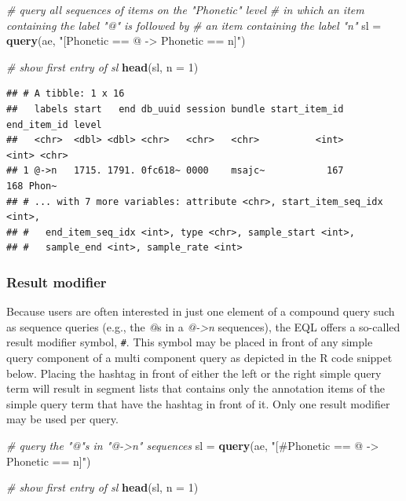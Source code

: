 \documentclass[]{book}
\newenvironment{Shaded}{\begin{snugshade}}{\end{snugshade}}
\newcommand{\CommentTok}[1]{\textcolor[rgb]{0.56,0.35,0.01}{\textit{#1}}}
\newcommand{\DataTypeTok}[1]{\textcolor[rgb]{0.13,0.29,0.53}{#1}}
\newcommand{\DecValTok}[1]{\textcolor[rgb]{0.00,0.00,0.81}{#1}}
\newcommand{\KeywordTok}[1]{\textcolor[rgb]{0.13,0.29,0.53}{\textbf{#1}}}
\newcommand{\NormalTok}[1]{#1}
\newcommand{\StringTok}[1]{\textcolor[rgb]{0.31,0.60,0.02}{#1}}
\begin{document}
\begin{Shaded}
\begin{Highlighting}[]
\CommentTok{# query all sequences of items on the "Phonetic" level}
\CommentTok{# in which an item containing the label "@" is followed by}
\CommentTok{# an item containing the label "n"}
\NormalTok{sl =}\StringTok{ }\KeywordTok{query}\NormalTok{(ae, }\StringTok{"[Phonetic == @ -> Phonetic == n]"}\NormalTok{)}

\CommentTok{# show first entry of sl}
\KeywordTok{head}\NormalTok{(sl, }\DataTypeTok{n =} \DecValTok{1}\NormalTok{)}
\end{Highlighting}
\end{Shaded}

\begin{verbatim}
## # A tibble: 1 x 16
##   labels start   end db_uuid session bundle start_item_id end_item_id level
##   <chr>  <dbl> <dbl> <chr>   <chr>   <chr>          <int>       <int> <chr>
## 1 @->n   1715. 1791. 0fc618~ 0000    msajc~           167         168 Phon~
## # ... with 7 more variables: attribute <chr>, start_item_seq_idx <int>,
## #   end_item_seq_idx <int>, type <chr>, sample_start <int>,
## #   sample_end <int>, sample_rate <int>
\end{verbatim}

\hypertarget{result-modifier}{%
\subsubsection{Result modifier}\label{result-modifier}}

Because users are often interested in just one element of a compound query such as sequence queries (e.g., the \emph{@}s in a \emph{@-\textgreater{}n} sequences), the EQL offers a so-called result modifier symbol, \texttt{\#}. This symbol may be placed in front of any simple query component of a multi component query as depicted in the R code snippet below. Placing the hashtag in front of either the left or the right simple query term will result in segment lists that contains only the annotation items of the simple query term that have the hashtag in front of it. Only one result modifier may be used per query.

\begin{Shaded}
\begin{Highlighting}[]
\CommentTok{# query the "@"s in "@->n" sequences}
\NormalTok{sl =}\StringTok{ }\KeywordTok{query}\NormalTok{(ae, }\StringTok{"[#Phonetic == @ -> Phonetic == n]"}\NormalTok{)}

\CommentTok{# show first entry of sl}
\KeywordTok{head}\NormalTok{(sl, }\DataTypeTok{n =} \DecValTok{1}\NormalTok{)}
\end{Highlighting}
\end{Shaded}
\end{document}
